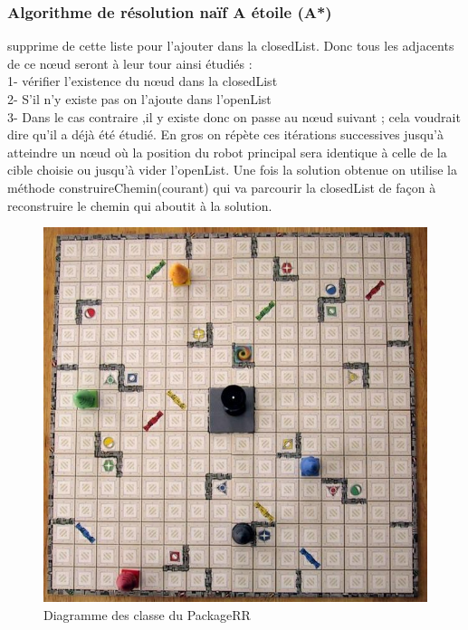 \documentclass{beamer}
\begin{document}
\begin{frame}
	\frametitle{Algorithme de résolution naïf A étoile (A*)}
		supprime de cette liste pour l’ajouter dans la closedList.
		Donc tous les adjacents de ce nœud seront  à leur tour ainsi étudiés :
		\\ 1-  vérifier l’existence du nœud dans la closedList
		\\2-  S’il n’y existe pas on l’ajoute dans l’openList
		\\ 3-  Dans le cas contraire ,il y  existe donc on passe au nœud suivant ; cela voudrait dire qu’il a déjà été étudié.
		En gros on répète ces itérations successives jusqu’à atteindre un nœud où la position du robot principal sera identique à celle de la cible choisie ou jusqu’à vider l’openList.
		Une fois la solution obtenue on utilise la méthode construireChemin(courant) qui va parcourir la closedList de façon à reconstruire le chemin qui aboutit à la solution.  
		
		
	\end{frame}
	
	\begin{frame}
		\begin{figure}[htpb]
			\includegraphics[scale=0.16]{./images/9.jpg}
			\caption{Diagramme des classe du PackageRR \label{figure1} }
		\end{figure}
	\end{frame}
	
\end{document}
